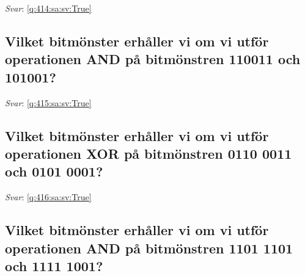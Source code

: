 \documentclass[a4paper,11pt,oneside]{article}
\begin{document}
\begin{sloppypar}
\label{q:414:sa:sv:False}

\vspace{2cm}

\noindent\makebox[\textwidth]{\hrulefill}

\vspace{1cm}

\textit{Svar}: \autoref{q:414:sa:sv:True}



\subsection{Vilket bitm\"onster erh\r{a}ller vi om vi utf\"or operationen AND p\r{a} bitm\"onstren 110011 och 101001?}

\label{q:415:sa:sv:False}

\vspace{2cm}

\noindent\makebox[\textwidth]{\hrulefill}

\vspace{1cm}

\textit{Svar}: \autoref{q:415:sa:sv:True}



\subsection{Vilket bitm\"onster erh\r{a}ller vi om vi utf\"or operationen XOR p\r{a} bitm\"onstren 0110 0011 och 0101 0001?}

\label{q:416:sa:sv:False}

\vspace{2cm}

\noindent\makebox[\textwidth]{\hrulefill}

\vspace{1cm}

\textit{Svar}: \autoref{q:416:sa:sv:True}



\subsection{Vilket bitm\"onster erh\r{a}ller vi om vi utf\"or operationen AND p\r{a} bitm\"onstren 1101 1101 och 1111 1001?}

\label{q:417:sa:sv:False}

\vspace{2cm}

\noindent\makebox[\textwidth]{\hrulefill}


\end{sloppypar}
\end{document}
